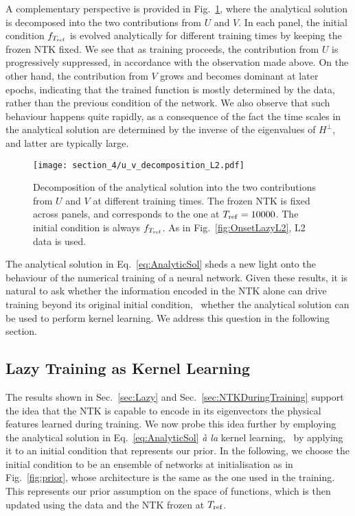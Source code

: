 A complementary perspective is provided in Fig.~\ref{fig:FrefDecompositionL2},
where the analytical solution is decomposed into the two contributions from $U$
and $V$. In each panel, the initial condition $f_{T_{\rm ref}}$ is evolved
analytically for different training times by keeping the frozen NTK fixed. We
see that as training proceeds, the contribution from $U$ is progressively
suppressed, in accordance with the observation made above. On the other hand,
the contribution from $V$ grows and becomes dominant at later epochs, indicating
that the trained function is mostly determined by the data, rather than the
previous condition of the network. We also observe that such behaviour happens
quite rapidly, as a consequence of the fact the time scales in the analytical solution are
determined by the inverse of the eigenvalues of $H^\perp$, and latter 
are typically large.
\begin{figure}[ht]
    \centering
    \texttt{[image: section\_4/u\_v\_decomposition\_L2.pdf]} 
    \caption{Decomposition of the analytical solution into the two contributions
    from $U$ and $V$ at different training times. The frozen NTK is fixed across
    panels, and corresponds to the one at $T_{\rm ref} = 10000$. The initial
    condition is always $f_{T_{\rm ref}}$. As in Fig.~\ref{fig:OnsetLazyL2}, L2 data
    is used.}
    \label{fig:FrefDecompositionL2}
  \end{figure}
  
  
The analytical solution in Eq.~\eqref{eq:AnalyticSol} sheds a new light onto the
behaviour of the numerical training of a neural network. Given these results, it
is natural to ask whether the information encoded in the NTK alone can drive
training beyond its original initial condition, \ie\ whether the analytical
solution can be used to perform kernel learning. We address this question in the
following section.

\subsection{Lazy Training as Kernel Learning}
\label{sec:NTKKernelLearning}

The results shown in Sec.~\ref{sec:Lazy} and Sec.~\ref{sec:NTKDuringTraining}
support the idea that the NTK is capable to encode in its eigenvectors 
the physical features learned
during training. We now probe this idea further by employing the analytical
solution in Eq.~\eqref{eq:AnalyticSol} \textit{\`a la} kernel learning, \ie\ by
applying it to an initial condition that represents our prior. In the following,
we choose the initial condition to be an ensemble of networks at initialisation
as in Fig.~\ref{fig:prior}, whose architecture is the same as the one used in
the training. This represents our prior assumption on the space of functions,
which is then updated using the data and the NTK frozen at $T_{\rm ref}$.

